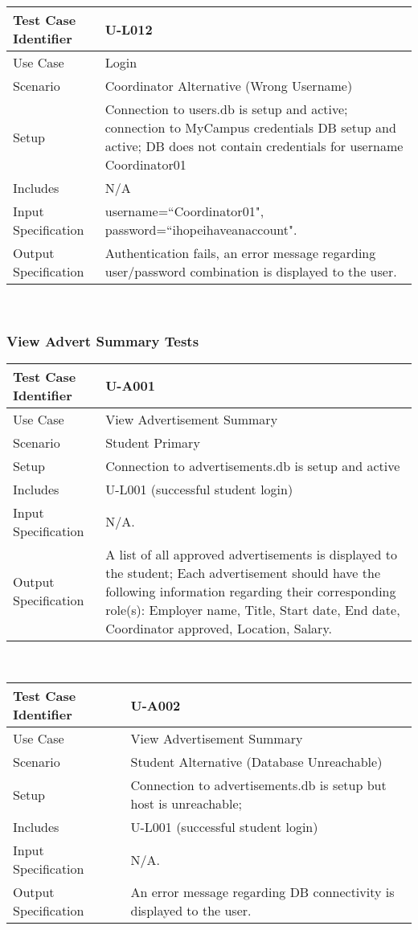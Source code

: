 \documentclass{l3deliverable}
\begin{document}
\begin{tabular}{lp{10cm}}
\hline 
\textbf{Test Case Identifier} & U-L012\tabularnewline
\hline 
\hline 
Use Case & Login \tabularnewline
\hline 
Scenario & Coordinator Alternative (Wrong Username) \tabularnewline
\hline 
Setup & Connection to users.db is setup and active; connection to MyCampus credentials DB setup and active; DB does not contain credentials for username Coordinator01 \tabularnewline
\hline 
Includes & N/A \tabularnewline
\hline 
Input Specification & username=``Coordinator01", password=``ihopeihaveanaccount".\tabularnewline
\hline 
Output Specification & Authentication fails, an error message regarding user/password combination is displayed to the user.\tabularnewline
\hline 
\end{tabular}\\

\subsubsection{View Advert Summary Tests}

\begin{tabular}{lp{10cm}}
\hline 
\textbf{Test Case Identifier} & U-A001\tabularnewline
\hline 
\hline 
Use Case & View Advertisement Summary \tabularnewline
\hline 
Scenario & Student Primary \tabularnewline
\hline 
Setup & Connection to advertisements.db is setup and active \tabularnewline
\hline 
Includes &  U-L001 (successful student login) \tabularnewline
\hline 
Input Specification & N/A.\tabularnewline
\hline 
Output Specification &  A list of all approved advertisements is displayed to the student; Each advertisement should have the following information regarding their corresponding role(s): Employer name, Title, Start date, End date, Coordinator approved, Location, Salary.\tabularnewline
\hline 
\end{tabular}\\

\begin{tabular}{lp{10cm}}
\hline 
\textbf{Test Case Identifier} & U-A002\tabularnewline
\hline 
\hline 
Use Case & View Advertisement Summary \tabularnewline
\hline 
Scenario & Student Alternative (Database Unreachable) \tabularnewline
\hline 
Setup & Connection to advertisements.db is setup but host is unreachable; \tabularnewline
\hline 
Includes &  U-L001 (successful student login) \tabularnewline
\hline 
Input Specification & N/A.\tabularnewline
\hline 
Output Specification & An error message regarding DB connectivity is displayed to the user.\tabularnewline
\hline 
\end{tabular}\\
\end{document}
